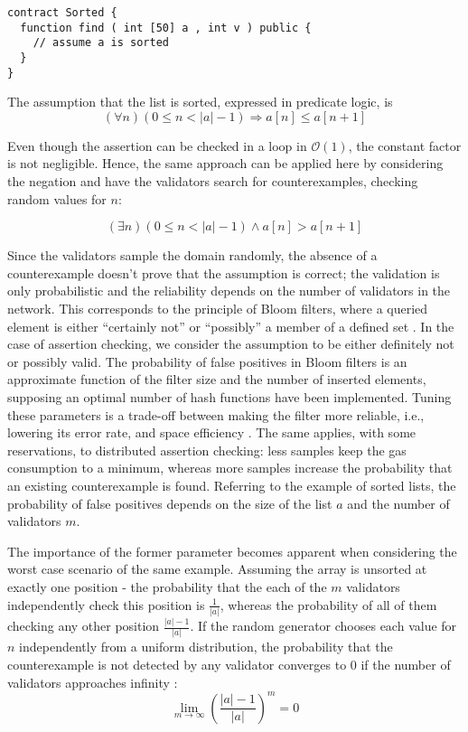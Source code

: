 \begin{lstlisting}[caption=Smart contract expecting a sorted array \cite{thiemann_2020}, numbers=none, language=Solidity, label=lst:sorted]
contract Sorted {
  function find ( int [50] a , int v ) public {
    // assume a is sorted
  }
}
\end{lstlisting}
 
The assumption that the list is sorted, expressed in predicate logic, is
\begin{equation}\label{eq:sorted}
	(\forall n) (0 \leq n < |a| - 1) \Rightarrow a[n] \leq a[n+1]
\end{equation}

Even though the assertion can be checked in a loop in $\mathcal{O}(1)$, the constant factor is not negligible. Hence, the same approach can be applied here by considering the negation and have the validators search for counterexamples, checking random values for $n$:
 
\begin{equation}\label{eq:sorted_neg}
	(\exists n) (0 \leq n < |a| - 1) \wedge a[n] > a[n+1]
\end{equation}

Since the validators sample the domain randomly, the absence of a counterexample doesn't prove that the assumption is correct; the validation is only probabilistic and the reliability depends on the number of validators in the network. This corresponds to the principle of Bloom filters, where a queried element is either ``certainly not'' or ``possibly'' a member of a defined set \cite{blustein_bloom_2002}. In the case of assertion checking, we consider the assumption to be either definitely not or possibly valid. The probability of false positives in Bloom filters is an approximate function of the filter size and the number of inserted elements, supposing an optimal number of hash functions have been implemented. Tuning these parameters is a trade-off between making the filter more reliable, i.e., lowering its error rate, and space efficiency \cite{blustein_bloom_2002}. The same applies, with some reservations, to distributed assertion checking: less samples keep the gas consumption to a minimum, whereas more samples increase the probability that an existing counterexample is found. Referring to the example of sorted lists,  the probability of false positives depends on the size of the list $a$ and the number of validators $m$.

The importance of the former parameter becomes apparent when considering the worst case scenario of the same example. Assuming the array is unsorted at exactly one position - the probability that the each of the $m$ validators independently check this position is $\frac{1}{|a|}$, whereas the probability of all of them checking any other position $\frac{|a|-1}{|a|}$. If the random generator chooses each value for $n$ independently from a uniform distribution, the probability that the counterexample is not detected by any validator converges to 0 if the number of validators approaches infinity \cite{thiemann_2020}:
\begin{equation}\label{eq:limes_validators}
	\lim_{m\to\infty} \left(\frac{|a|-1}{|a|}\right)^m = 0
\end{equation}

